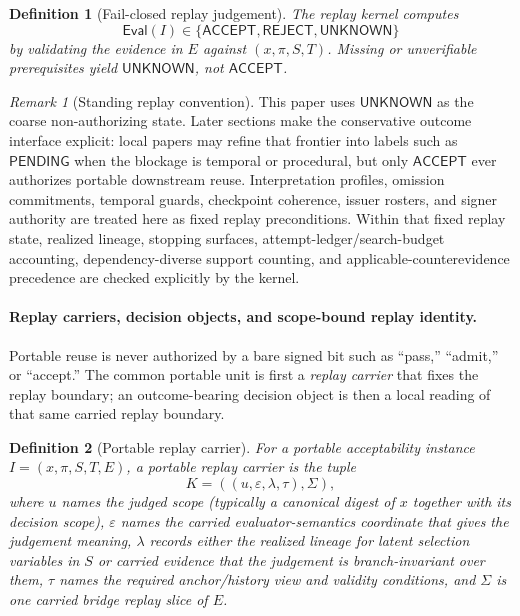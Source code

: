 \documentclass[11pt]{article}
\newtheorem{definition}{Definition}
\theoremstyle{remark}
\newtheorem{remark}{Remark}
\newcommand{\Acc}{\mathsf{ACCEPT}}
\newcommand{\Rej}{\mathsf{REJECT}}
\newcommand{\Unk}{\mathsf{UNKNOWN}}
\newcommand{\Eval}{\mathsf{Eval}}
\newcommand{\Pend}{\mathsf{PENDING}}
\begin{document}
\begin{definition}[Fail-closed replay judgement]
The replay kernel computes
\[
\Eval(I)\in\{\Acc,\Rej,\Unk\}
\]
by validating the evidence in $E$ against $(x,\pi,S,T)$. Missing or unverifiable prerequisites yield $\Unk$, not $\Acc$.
\end{definition}

\begin{remark}[Standing replay convention]
This paper uses $\Unk$ as the coarse non-authorizing state. Later sections make the conservative outcome interface explicit: local papers may refine that frontier into labels such as $\Pend$ when the blockage is temporal or procedural, but only $\Acc$ ever authorizes portable downstream reuse. Interpretation profiles, omission commitments, temporal guards, checkpoint coherence, issuer rosters, and signer authority are treated here as fixed replay preconditions. Within that fixed replay state, realized lineage, stopping surfaces, attempt-ledger/search-budget accounting, dependency-diverse support counting, and applicable-counterevidence precedence are checked explicitly by the kernel.
\end{remark}

\paragraph{Replay carriers, decision objects, and scope-bound replay identity.} Portable reuse is never authorized by a bare signed bit such as ``pass,'' ``admit,'' or ``accept.''
The common portable unit is first a \emph{replay carrier} that fixes the replay boundary; an outcome-bearing decision object is then a local reading of that same carried replay boundary.

\begin{definition}[Portable replay carrier]
For a portable acceptability instance $I=(x,\pi,S,T,E)$, a portable replay carrier is the tuple
\[
K=((u,\varepsilon,\lambda,\tau),\Sigma),
\]
where $u$ names the judged scope (typically a canonical digest of $x$ together with its decision scope),
$\varepsilon$ names the carried evaluator-semantics coordinate that gives the judgement meaning,
$\lambda$ records either the realized lineage for latent selection variables in $S$ or carried evidence that the judgement is branch-invariant over them,
$\tau$ names the required anchor/history view and validity conditions,
and $\Sigma$ is one carried bridge replay slice of $E$.
\end{definition}
\end{document}
